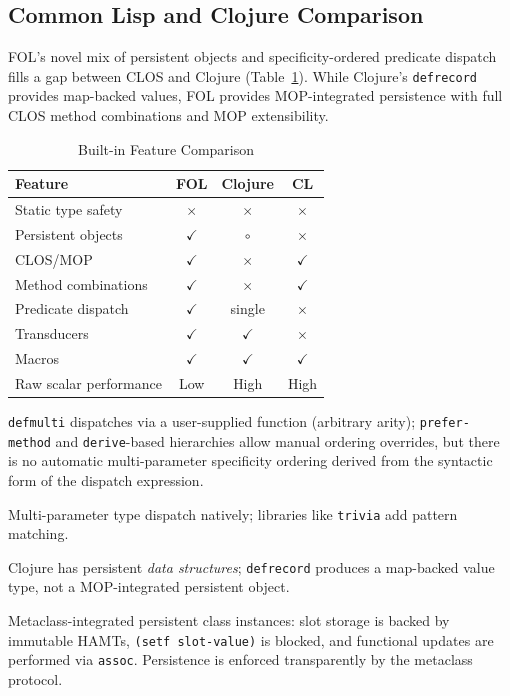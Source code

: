 \documentclass[sigconf,nonacm]{acmart}
\begin{document}
\subsection{Common Lisp and Clojure Comparison}
FOL's novel mix of persistent objects and specificity-ordered predicate dispatch fills a gap between CLOS and Clojure (Table~\ref{tab:specificity-comp}). While Clojure's \texttt{defrecord} provides map-backed values, FOL provides MOP-integrated persistence with full CLOS method combinations and MOP extensibility.
\begin{table}[htbp]
\centering
\caption{Built-in Feature Comparison}
\label{tab:specificity-comp}
\small
\begin{threeparttable}
    \begin{tabular}{lccc}
    \toprule
    \textbf{Feature} & \textbf{FOL} & \textbf{Clojure} & \textbf{CL} \\
    \midrule
    Static type safety & $\times$ & $\times$ & $\times$ \\
    Persistent objects & $\checkmark$\tnote{d} & $\circ$\tnote{c} & $\times$ \\
    CLOS/MOP & $\checkmark$ & $\times$ & $\checkmark$ \\
    Method combinations & $\checkmark$ & $\times$ & $\checkmark$ \\
    Predicate dispatch & $\checkmark$ & single\tnote{a} & $\times$\tnote{b} \\
    Transducers & $\checkmark$ & $\checkmark$ & $\times$ \\
    Macros & $\checkmark$ & $\checkmark$ & $\checkmark$ \\
    Raw scalar performance & Low & High & High \\
    \bottomrule
    \end{tabular}
    \begin{tablenotes}
        \footnotesize
        \item[a] \texttt{defmulti} dispatches via a user-supplied function (arbitrary arity); \texttt{prefer-method} and \texttt{derive}-based hierarchies allow manual ordering overrides, but there is no automatic multi-parameter specificity ordering derived from the syntactic form of the dispatch expression.
    \item[b] Multi-parameter type dispatch natively; libraries like \texttt{trivia} add pattern matching.
    \item[c] Clojure has persistent \textit{data structures}; \texttt{defrecord} produces a map-backed value type, not a MOP-integrated persistent object.
    \item[d] Metaclass-integrated persistent class instances: slot storage is backed by immutable HAMTs, \texttt{(setf slot-value)} is blocked, and functional updates are performed via \texttt{assoc}. Persistence is enforced transparently by the metaclass protocol.
    \end{tablenotes}
\end{threeparttable}
\end{table}
\end{document}
